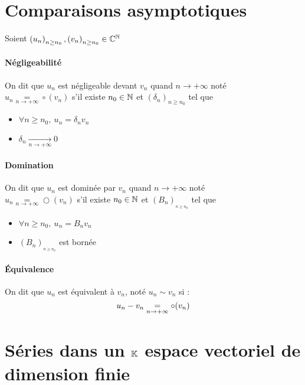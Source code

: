 \section{Comparaisons asymptotiques}
	
		Soient $\left(u_n\right)_{n\geq n_0} ,\left(v_n\right)_{n\geq n_0} \in {\mathbb{C}}^{{\mathbb{N}}}$ 
		
		\vspace{-10pt}
		\traitd
		\paragraph{Négligeabilité}
			On dit que $u_n$ est négligeable devant $v_n$ quand $n\rightarrow +\infty$ noté \\
			$u_n \underset{n\rightarrow +\infty}{=} \circ (v_n)$ s'il existe $n_0 \in {\mathbb{N}}$ et $\left(\delta_n\right)_{n\geq n_0}$ tel que
			\begin{itemize}
				\item $\forall n\geq n_0 ,~u_n = \delta_nv_n$
				\item $\delta_n \underset{n\rightarrow +\infty}{\longrightarrow} 0$
			\end{itemize}
		\traitdouble
		\paragraph{Domination}
			On dit que $u_n$ est dominée par $v_n$ quand $n\rightarrow +\infty$ noté \\
			$u_n \underset{n\rightarrow +\infty}{=} \bigcirc (v_n)$ s'il existe $n_0 \in {\mathbb{N}}$ et $\left(B_n\right)_{_{n\geq n_0}}$ tel que
			\begin{itemize}
				\item $\forall n\geq n_0 ,~u_n = B_nv_n$ 
				\item $\left( B_n \right)_{_{n\geq n_0}}$ est bornée
			\end{itemize}
		\traitdouble
		\paragraph{Équivalence}
			On dit que $u_n$ est équivalent à $v_n$, noté $u_n \sim v_n$ 
			si : 
			\[
				u_n - v_n \underset{n\rightarrow +\infty}{=} \circ (v_n) 
			\vspace*{-20pt}
			\]
		\trait

		
\section{Séries dans un ${\mathbb{K}}$ espace vectoriel de dimension finie}
		
